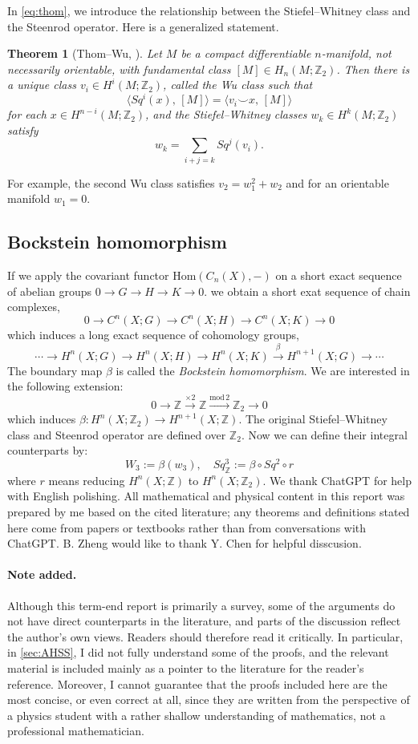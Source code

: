 \documentclass[a4paper,11pt]{article}
\newtheorem{theorem}{Theorem}[section]
\theoremstyle{definition}
\theoremstyle{remark}
\begin{document}
In \cref{eq:thom}, we introduce the relationship between the Stiefel--Whitney class and the Steenrod operator. Here is a generalized statement.
\begin{theorem}[Thom--Wu, \cite{adams1992formulae}]
	Let $M$ be a compact differentiable $n$-manifold, not necessarily orientable, with fundamental class
	$[M]\in H_n(M;\mathbb{Z}_2)$. Then there is a unique class $v_i\in H^i(M;\mathbb{Z}_2)$, called the Wu class such that
	\[
	\langle Sq^i (x),\,[M]\rangle=\langle v_i\smile x,\,[M]\rangle
	\]
	for each $x\in H^{n-i}(M;\mathbb{Z}_2)$, and the Stiefel--Whitney classes $w_k\in H^k(M;\mathbb{Z}_2)$
	satisfy
	\[
	w_k=\sum_{i+j=k} Sq^j (v_i).
	\]
\end{theorem}
For example, the second Wu class satisfies $v_2=w_1^2+w_2$ and for an orientable manifold $w_1=0$.
\subsection{Bockstein homomorphism}
\label{bock}
If we apply the covariant functor $\mathrm{Hom}(C_n(X),-)$ on a short exact sequence of abelian groups $0\boldsymbol{\to}G\boldsymbol{\to}H\boldsymbol{\to}K\boldsymbol{\to}0$. we obtain a short exat sequence of chain complexes,
\[
0\to C^n(X;G)\to C^n(X;H)\to C^n(X;K)\to0
\]
which induces a long exact sequence of cohomology groups,
\[
\cdots\to H^n(X;G)\to H^n(X;H)\to H^n(X;K)\overset{\beta}{\to} H^{n+1}(X;G)\to\cdots
\]
The boundary map $\beta$ is called the {\itshape Bockstein homomorphism}. We are interested in the following extension:
\[
0\to\mathbb{Z}\xrightarrow{\times 2}\mathbb{Z}\xrightarrow{\mathrm{mod}\,2}\mathbb{Z}_2\to0
\]
which induces $\beta: H^n(X;\mathbb{Z}_2)\to H^{n+1}(X;\mathbb{Z})$. The original Stiefel--Whitney class and Steenrod operator are defined over $\mathbb{Z}_2$. Now we can define their integral counterparts by:
\[
W_3:=\beta(w_3),\quad Sq^3_{\mathbb{Z}}:=\beta\circ Sq^2\circ r
\]
where $r$ means reducing $H^n(X;\mathbb{Z})$ to $H^{n}(X;\mathbb{Z}_2)$.
\acknowledgments
We thank ChatGPT for help with English polishing. All mathematical and physical content in this report was prepared by me based on the cited literature; any theorems and definitions stated here come from papers or textbooks rather than from conversations with ChatGPT. B. Zheng would like to thank Y. Chen for helpful disscusion.

\paragraph{Note added.} Although this term-end report is primarily a survey, some of the arguments do not have direct counterparts in the literature, and parts of the discussion reflect the author’s own views. Readers should therefore read it critically. In particular, in \cref{sec:AHSS}, I did not fully understand some of the proofs, and the relevant material is included mainly as a pointer to the literature for the reader’s reference. Moreover, I cannot guarantee that the proofs included here are the most concise, or even correct at all, since they are written from the perspective of a physics student with a rather shallow understanding of mathematics, not a professional mathematician.



\end{document}
